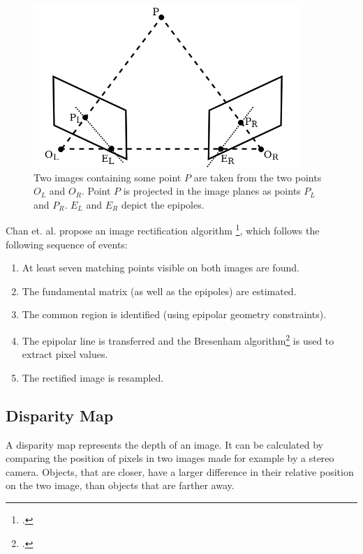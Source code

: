 \begin{figure}[h!]
	\centering
	\includegraphics[width=4in]{img/methodology_stereoCamera_imageRectification.png}
	\caption{Two images containing some point $P$ are taken from the two points $O_L$ and $O_R$. Point $P$ is projected in the image planes as points $P_L$ and $P_R$. $E_L$ and $E_R$ depict the epipoles.}
	\label{pic:methodology_stereoCamera_imageRectification}
\end{figure}

Chan et. al. propose an image rectification algorithm \footcite{Chen_New_Image_Rectification_Algorithm}, which follows the following sequence of events:

\begin{enumerate}
	\item At least seven matching points visible on both images are found.
	\item The fundamental matrix (as well as the epipoles) are estimated.
	\item The common region is identified (using epipolar geometry constraints).
	\item The epipolar line is transferred and the Bresenham algorithm\footcite{Bresenham_Linear_Algorithm_For_Incremental_Digital_Display_Of_Circular_Arcs} is used to extract pixel values.
	\item The rectified image is resampled.
\end{enumerate}

\subsection{Disparity Map}
A disparity map represents the depth of an image. It can be calculated by comparing the position of pixels in two images made for example by a stereo camera. Objects, that are closer, have a larger difference in their relative position on the two image, than objects that are farther away.

